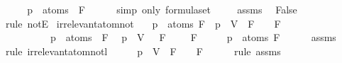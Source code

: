 \begin{isabellebody}
\ \ \isamarkupfalse%
\ \isamarkupfalse%
\ {\isachardoublequoteopen}p\ {\isasymin}\ atoms\ {\isacharparenleft}\isactrlbold {\isasymnot}\ F{\isacharparenright}{\isachardoublequoteclose}\isanewline
\ \ \ \ \isamarkupfalse%
\ {\isacharparenleft}simp\ only{\isacharcolon}\ formula{\isachardot}set{\isacharparenleft}{}{\isacharparenright}{\isacharparenright}\ \isanewline
\ \ \isamarkupfalse%
\ assms\ \isamarkupfalse%
\ False\isanewline
\ \ \ \ \isamarkupfalse%
\ {\isacharparenleft}rule\ notE{\isacharparenright}\isanewline
{}\isamarkupfalse%
%
\endisatagproof
{\isafoldproof}%
%
\isadelimproof
\isanewline
%
\endisadelimproof
\isanewline
{}\isamarkupfalse%
\ irrelevant{\isacharunderscore}atom{\isacharunderscore}not{\isacharcolon}\isanewline
\ \ \ {\isachardoublequoteopen}p\ {\isasymnotin}\ atoms\ F\ {\isasymLongrightarrow}\ {\isasymA}{\isacharparenleft}p\ {\isacharcolon}{\isacharequal}\ V{\isacharparenright}\ {\isasymTurnstile}\ F\ {\isasymlongleftrightarrow}\ {\isasymA}\ {\isasymTurnstile}\ F{\isachardoublequoteclose}\isanewline
\ \ \ \ \ \ \ \ \ \ {\isachardoublequoteopen}p\ {\isasymnotin}\ atoms\ {\isacharparenleft}\isactrlbold {\isasymnot}\ F{\isacharparenright}{\isachardoublequoteclose}\isanewline
\ \ {\isachardoublequoteopen}{\isasymA}{\isacharparenleft}p\ {\isacharcolon}{\isacharequal}\ V{\isacharparenright}\ {\isasymTurnstile}\ \isactrlbold {\isasymnot}\ F\ {\isasymlongleftrightarrow}\ {\isasymA}\ {\isasymTurnstile}\ \isactrlbold {\isasymnot}\ F{\isachardoublequoteclose}\isanewline
%
\isadelimproof
%
\endisadelimproof
%
\isatagproof
{}\isamarkupfalse%
\ {\isacharminus}\isanewline
\ \ \isamarkupfalse%
\ {\isachardoublequoteopen}p\ {\isasymnotin}\ atoms\ F{\isachardoublequoteclose}\isanewline
\ \ \ \ \isamarkupfalse%
\ assms{\isacharparenleft}{}{\isacharparenright}\ \isamarkupfalse%
\ {\isacharparenleft}rule\ irrelevant{\isacharunderscore}atom{\isacharunderscore}not{\isacharunderscore}l{}{\isacharparenright}\isanewline
\ \ \isamarkupfalse%
\ \isamarkupfalse%
\ {\isachardoublequoteopen}{\isasymA}{\isacharparenleft}p\ {\isacharcolon}{\isacharequal}\ V{\isacharparenright}\ {\isasymTurnstile}\ F\ {\isasymlongleftrightarrow}\ {\isasymA}\ {\isasymTurnstile}\ F{\isachardoublequoteclose}\isanewline
\ \ \ \ \isamarkupfalse%
\ {\isacharparenleft}rule\ assms{\isacharparenleft}{}{\isacharparenright}{\isacharparenright}\isanewline

\end{isabellebody}
